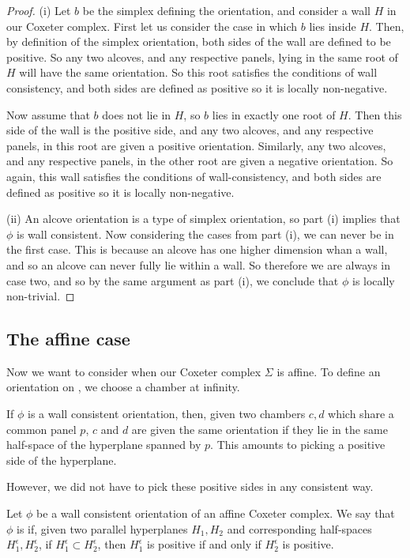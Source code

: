 \documentclass[11pt]{article}
\begin{document}
\begin{proof}
    (i) Let $b$ be the simplex defining the orientation, and consider a wall $H$ in our Coxeter complex. First let us consider the case in which $b$ lies inside $H$. Then, by definition of the simplex orientation, both sides of the wall are defined to be positive. So any two alcoves, and any respective panels, lying in the same root of $H$ will have the same orientation. So this root satisfies the conditions of wall consistency, and both sides are defined as positive so it is locally non-negative. 
    
    Now assume that $b$ does not lie in $H$, so $b$ lies in exactly one root of $H$. Then this side of the wall is the positive side, and any two alcoves, and any respective panels, in this root are given a positive orientation. Similarly, any two alcoves, and any respective panels, in the other root are given a negative orientation. So again, this wall satisfies the conditions of wall-consistency, and both sides are defined as positive so it is locally non-negative. 

    (ii) An alcove orientation is a type of simplex orientation, so part (i) implies that $\phi$ is wall consistent. Now considering the cases from part (i), we can never be in the first case. This is because an alcove has one higher dimension whan a wall, and so an alcove can never fully lie within a wall. So therefore we are always in case two, and so by the same argument as part (i), we conclude that $\phi$ is locally non-trivial. 
\end{proof}

\subsection{The affine case}

Now we want to consider when our Coxeter complex $\Sigma$ is affine. To define an orientation on \sg, we choose a chamber at infinity.

If $\phi$ is a wall consistent orientation, then, given two chambers $c,d$ which share a common panel $p$, $c$ and $d$ are given the same orientation if they lie in the same half-space of the hyperplane spanned by $p$. This amounts to picking a positive side of the hyperplane.

However, we did not have to pick these positive sides in any consistent way. 

\begin{definition}
    Let $\phi$ be a wall consistent orientation of an affine Coxeter complex. We say that $\phi$ is  if, given two parallel hyperplanes $H_1,H_2$ and corresponding half-spaces $H_1^{\epsilon},H_2^{\epsilon}$, if $H_1^{\epsilon}\subset H_2^{\epsilon}$, then $H_1^{\epsilon}$ is positive if and only if $H_2^{\epsilon}$ is positive. 
\end{definition}
\end{document}
